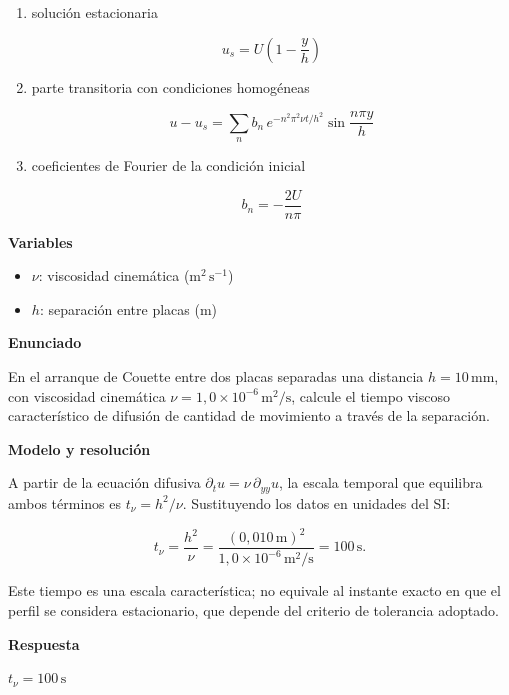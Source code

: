 \documentclass[10pt,openany]{book}
\begin{document}
\begin{tcolorbox}[title={Desarrollos del modelo}, studiumdef, breakable]
\begin{enumerate}
\[
\frac{\partial u}{\partial t} = \nu\,\frac{\partial^{2}u}{\partial y^{2}}
\]
\item
solución estacionaria

\[
u_s = U\left(1 - \frac{y}{h}\right)
\]
\item
parte transitoria con condiciones homogéneas

\[
u - u_s = \sum_{n} b_n\,e^{-n^{2}\pi^{2}\nu t/h^{2}}\sin\frac{n\pi y}{h}
\]
\item
coeficientes de Fourier de la condición inicial

\[
b_n = -\frac{2U}{n\pi}
\]
\end{enumerate}

\noindent\textbf{Variables}
\begin{itemize}
\item $\nu$: viscosidad cinemática ($\mathrm{m}^{2}\,\mathrm{s}^{-1}$)
\item $h$: separación entre placas ($\mathrm{m}$)
\end{itemize}


\end{tcolorbox}

\begin{tcolorbox}[title={Problema resuelto}, studiumworked, breakable]

\noindent\textbf{Enunciado}

En el arranque de Couette entre dos placas separadas una distancia \(h=10\,\mathrm{mm}\), con viscosidad cinemática \(\nu=1{,}0\times10^{-6}\,\mathrm{m^2/s}\), calcule el tiempo viscoso característico de difusión de cantidad de movimiento a través de la separación.

\noindent\textbf{Modelo y resolución}

A partir de la ecuación difusiva \(\partial_t u=\nu\,\partial_{yy}u\), la escala temporal que equilibra ambos términos es \(t_{\nu}=h^2/\nu\). Sustituyendo los datos en unidades del SI:

\[
 t_{\nu}=\frac{h^2}{\nu}=\frac{(0{,}010\,\mathrm{m})^2}{1{,}0\times10^{-6}\,\mathrm{m^2/s}}=100\,\mathrm{s}.
\]

Este tiempo es una escala característica; no equivale al instante exacto en que el perfil se considera estacionario, que depende del criterio de tolerancia adoptado.

\noindent\textbf{Respuesta}

\(t_{\nu}=100\,\mathrm{s}\)
\end{tcolorbox}
\end{document}
